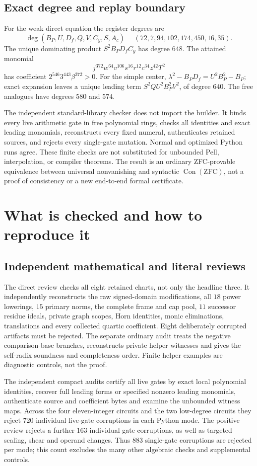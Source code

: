\documentclass[11pt]{article}
\begin{document}
\subsection{Exact degree and replay boundary}
For the weak direct equation the register degrees are
\[
 \deg(B_P,U,D_f,Q,V,C_y,S,A_c)=(72,7,94,102,174,450,16,35).
\]
The unique dominating product \(S^2B_PD_fC_y\) has degree \(648\).
The attained monomial
\[
 j^{372}w^{64}v^{106}s^{16}r^{12}c^{34}z^{42}T^2
\]
has coefficient \(2^{546}3^{443}\beta^{372}>0\).
For the simple center,
\(\lambda^2-B_PD_f=U^2B_P^2-B_P\); exact expansion leaves a unique
leading term \(S^2QU^2B_P^2V^2\), of degree \(640\).
The free analogues have degrees \(580\) and \(574\).

The independent standard-library checker does not import the builder.
It binds every live arithmetic gate in free polynomial rings, checks
all identities and exact leading monomials, reconstructs every fixed
numeral, authenticates retained sources, and rejects every single-gate
mutation. Normal and optimized Python runs agree. These finite checks
are not substituted for unbounded Pell, interpolation, or compiler
theorems. The result is an ordinary ZFC-provable equivalence between
universal nonvanishing and syntactic \(\operatorname{Con}(\mathrm{ZFC})\),
not a proof of consistency or a new end-to-end formal certificate.
\section{What is checked and how to reproduce it}
\subsection{Independent mathematical and literal reviews}
The direct review checks all eight retained charts, not only the headline
three. It independently reconstructs the raw signed-domain modifications,
all $18$ power lowerings, $15$ primary norms, the complete frame and cap pool,
$11$ successor residue ideals, private graph scopes, Horn identities,
monic eliminations, translations and every collected quartic coefficient.
Eight deliberately corrupted artifacts must be rejected. The separate
ordinary audit treats the negative comparison-base branches, reconstructs
private helper witnesses and gives the self-radix soundness and completeness
order. Finite helper examples are diagnostic controls, not the proof.

The independent compact audits certify all live gates by exact local
polynomial identities, recover full leading forms or specified nonzero
leading monomials, authenticate source and coefficient bytes and examine the
unbounded witness maps. Across the four eleven-integer circuits and the two
low-degree circuits they reject $720$ individual live-gate corruptions in
each Python mode. The positive review rejects a further $163$ individual
gate corruptions, as well as targeted scaling, shear and operand changes.
Thus $883$ single-gate corruptions are rejected per mode; this count excludes
the many other algebraic checks and supplemental controls.
\end{document}
